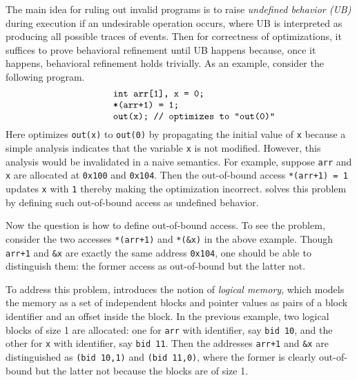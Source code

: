 {
%
The main idea for ruling out invalid programs is to raise
\emph{undefined behavior (UB)} during execution if an undesirable
operation occurs, where UB is interpreted as producing all possible
traces of events.  Then for correctness of optimizations, it suffices
to prove behavioral refinement until UB happens because, once it
happens, behavioral refinement holds trivially.
As an example, consider the following program.
%
\[
\begin{minipage}{0.4\textwidth}
\begin{verbatim}
int arr[1], x = 0;
*(arr+1) = 1;
out(x); // optimizes to "out(0)"
\end{verbatim}
\end{minipage}
\]
%
Here \cc{} optimizes \texttt{out(x)} to \texttt{out(0)} by
propagating the initial value of \texttt{x} because a simple analysis
indicates that the variable \texttt{x} is not modified.  However, this
analysis would be invalidated in a naive semantics.  For example,
suppose \texttt{arr} and \texttt{x} are allocated at \texttt{0x100}
and \texttt{0x104}. Then the out-of-bound access \texttt{*(arr+1) = 1}
updates \texttt{x} with \texttt{1} thereby making the optimization
incorrect.  \cc{} solves this problem by defining such out-of-bound
access as undefined behavior.

Now the question is how to define out-of-bound access. To see the
problem, consider the two accesses \texttt{*(arr+1)} and \texttt{*(\&x)}
in the above example. Though \texttt{arr+1} and \texttt{\&x} are exactly
the same address \texttt{0x104}, one should be able to distinguish them:
the former access as out-of-bound but the latter not.


%
To address this problem, \cc{} introduces the notion of \emph{logical
  memory}, which models the memory as a set of independent blocks and
pointer values as pairs of a block identifier and an offset inside the
block. In the previous example, two logical blocks of size 1 are
allocated: one for \texttt{arr} with identifier, say \texttt{bid 10},
and the other for \texttt{x} with identifier, say \texttt{bid
  11}. Then the addresses \texttt{arr+1} and \texttt{\&x} are
distinguished as \texttt{(bid 10,1)} and \texttt{(bid 11,0)}, where
the former is clearly out-of-bound but the latter not because the
blocks are of size 1.

}
